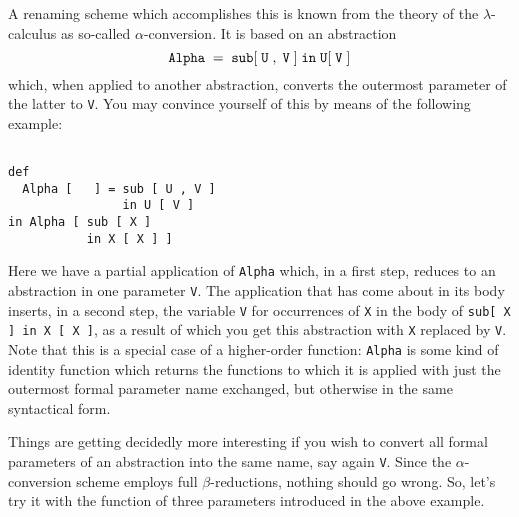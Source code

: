 A renaming scheme which accomplishes this is known from the theory
of the $\lambda$-calculus as so-called {\mys $\alpha$-conversion}. It is
based on an abstraction
$$
{\tt Alpha\;=\;sub[\;U\;,\;V\;]\;in\;U[\;V\;]}  
$$
which, when applied to another abstraction, converts the outermost parameter
of the latter to {\tt V}. You may convince yourself of this by means
of the following example:
\begin{verbatim}

def 
  Alpha [   ] = sub [ U , V ]
                in U [ V ]
in Alpha [ sub [ X ]
           in X [ X ] ]

\end{verbatim}
Here we have a {\mys partial application} of {\tt Alpha} which, in a first step,
reduces to an abstraction in one parameter {\tt V}. The application that has
come about in its body inserts, in a second step, the variable {\tt V}
for occurrences of {\tt X} in the body of {\tt sub[ X ] in X [ X ]},
as a result of which you get this abstraction with {\tt X} replaced
by {\tt V}. Note that this is a special case of  a higher-order function: {\tt Alpha} is some kind of {\mys identity function} which returns the
functions to which it is applied with just the outermost 
formal parameter name 
exchanged, but otherwise in the same syntactical form. 

Things are getting decidedly more interesting if you wish to convert
all formal parameters of an abstraction into the same name, say 
again {\tt V}. Since the $\alpha$-conversion scheme employs full
$\beta$-reductions, nothing should go wrong. So, let's try
it with the function of three parameters introduced in the
above example.

